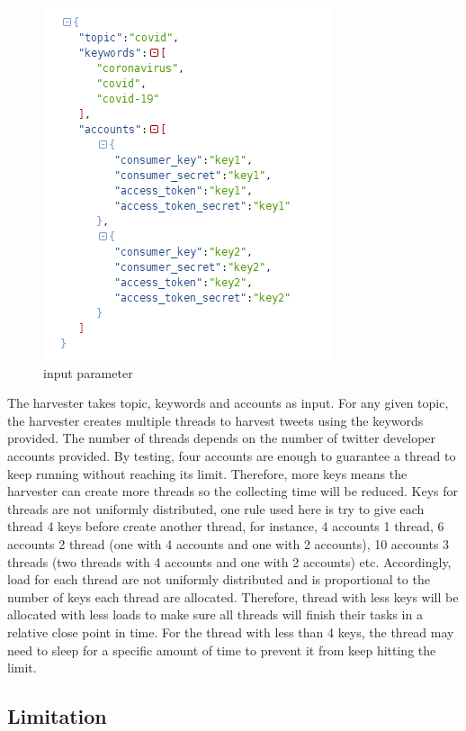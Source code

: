 \begin{figure}[h!]
\centering
\includegraphics[scale=0.8]{city_analytics/report/images/harvester_input.png}
\caption{input parameter}
\label{fig:input parameter}
\end{figure}


The harvester takes topic, keywords and accounts as input. For any given topic, the harvester creates multiple threads to harvest tweets using the keywords provided. The number of threads depends on the number of twitter developer accounts provided. By testing, four accounts are enough to guarantee a thread to keep running without reaching its limit. Therefore, more keys means the harvester can create more threads so the collecting time will be reduced. Keys for threads are not uniformly distributed, one rule used here is try to give each thread 4 keys before create another thread, for instance, 4 accounts 1 thread, 6 accounts 2 thread (one with 4 accounts and one with 2 accounts), 10 accounts 3 threads (two threads with 4 accounts and one with 2 accounts) etc. Accordingly, load for each thread are not uniformly distributed and is proportional to the number of keys each thread are allocated. Therefore, thread with less keys will be allocated with less loads to make sure all threads will finish their tasks in a relative close point in time. For the thread with less than 4 keys, the thread may need to sleep for a specific amount of time to prevent it from keep hitting the limit.


\subsection{Limitation}

